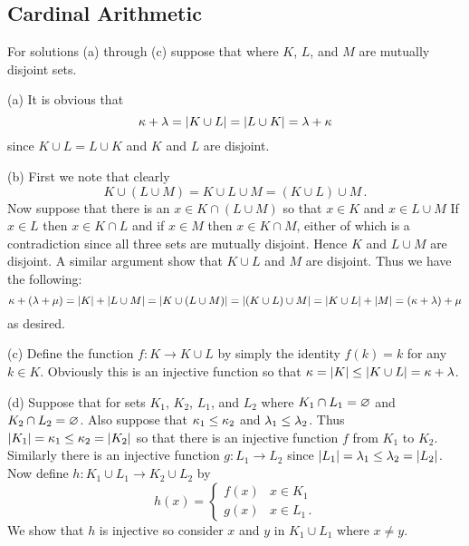 \subsection{Cardinal Arithmetic}

\begin{solution}
    For solutions (a) through (c) suppose that
    where $K$, $L$, and $M$ are mutually disjoint sets.

    (a) It is obvious that
    $$
    \kappa + \lambda = |K \cup L| = |L \cup K| = \lambda + \kappa
    $$
    since $K \cup L = L \cup K$ and $K$ and $L$ are disjoint. \qedsymbol

    (b) First we note that clearly
    $$
    K \cup (L \cup M) = K \cup L \cup M = (K \cup L) \cup M \,.
    $$
    Now suppose that there is an $x \in K \cap (L \cup M)$ so that $x \in K$ and $x \in L \cup M$
    If $x \in L$ then $x \in K \cap L$ and if $x \in M$ then $x \in K \cap M$, either of which is a contradiction since all three sets are mutually disjoint.
    Hence $K$ and $L \cup M$ are disjoint.
    A similar argument show that $K \cup L$ and $M$ are disjoint.
    Thus we have the following:
    $$
    \kappa + (\lambda + \mu) = |K| + |L \cup M| = |K \cup (L \cup M)| = |(K \cup L) \cup M| = |K \cup L| + |M| = (\kappa + \lambda) + \mu
    $$
    as desired. \qedsymbol

    (c) Define the function $f: K \to K \cup L$ by simply the identity $f(k) = k$ for any $k \in K$.
    Obviously this is an injective function so that $\kappa = |K| \leq |K \cup L| = \kappa + \lambda$. \qedsymbol

    (d) Suppose that
    for sets $K_1$, $K_2$, $L_1$, and $L_2$ where $K_1 \cap L_1 = \varnothing$ and $K_2 \cap L_2 = \varnothing$.
    Also suppose that $\kappa_1 \leq \kappa_2$ and $\lambda_1 \leq \lambda_2$.
    Thus $|K_1| = \kappa_1 \leq \kappa_2 = |K_2|$ so that there is an injective function $f$ from $K_1$ to $K_2$.
    Similarly there is an injective function $g : L_1 \to L_2$ since $|L_1| = \lambda_1 \leq \lambda_2 = |L_2|$.
    Now define $h : K_1 \cup L_1 \to K_2 \cup L_2$ by
    $$
    h(x) = \begin{cases}
    	f(x) & x \in K_1 \\
        g(x) & x \in L_1 \,.
    \end{cases}
    $$
    We show that $h$ is injective so consider $x$ and $y$ in $K_1 \cup L_1$ where $x \neq y$.


\end{solution}
